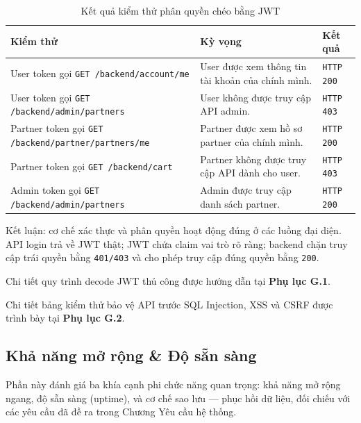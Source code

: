 \begin{table}[H]
\centering
\begin{tabularx}{\textwidth}{|p{}|X|p{}|}
\hline
\textbf{Kiểm thử} & \textbf{Kỳ vọng} & \textbf{Kết quả} \\
\hline
User token gọi \texttt{GET /backend/account/me} & User được xem thông tin tài khoản của chính mình. & \texttt{HTTP 200} \\
\hline
User token gọi \texttt{GET /backend/admin/partners} & User không được truy cập API admin. & \texttt{HTTP 403} \\
\hline
Partner token gọi \texttt{GET /backend/partner/partners/me} & Partner được xem hồ sơ partner của chính mình. & \texttt{HTTP 200} \\
\hline
Partner token gọi \texttt{GET /backend/cart} & Partner không được truy cập API dành cho user. & \texttt{HTTP 403} \\
\hline
Admin token gọi \texttt{GET /backend/admin/partners} & Admin được truy cập danh sách partner. & \texttt{HTTP 200} \\
\hline
\end{tabularx}
\caption{Kết quả kiểm thử phân quyền chéo bằng JWT}
\end{table}

Kết luận: cơ chế xác thực và phân quyền hoạt động đúng ở các luồng đại diện. API login trả về JWT thật; JWT chứa claim vai trò rõ ràng; backend chặn truy cập trái quyền bằng \texttt{401/403} và cho phép truy cập đúng quyền bằng \texttt{200}.


Chi tiết quy trình decode JWT thủ công được hướng dẫn tại \textbf{Phụ lục G.1}.


Chi tiết bảng kiểm thử bảo vệ API trước SQL Injection, XSS và CSRF được trình bày tại \textbf{Phụ lục G.2}.

\subsection{Khả năng mở rộng \& Độ sẵn sàng}

Phần này đánh giá ba khía cạnh phi chức năng quan trọng: khả năng mở rộng ngang, độ sẵn sàng (uptime), và cơ chế sao lưu --- phục hồi dữ liệu, đối chiếu với các yêu cầu đã đề ra trong Chương Yêu cầu hệ thống.

